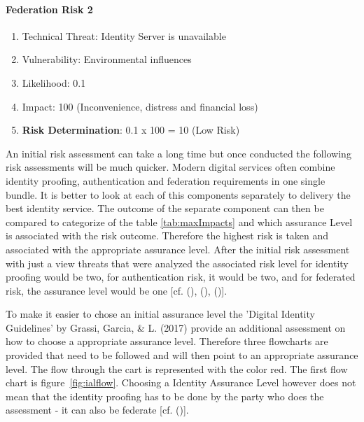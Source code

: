 \paragraph{Federation Risk 2 }
\begin{enumerate}
	\item Technical Threat: Identity Server is unavailable
	\item Vulnerability: Environmental influences 
	\item Likelihood: 0.1
	\item Impact: 100 (Inconvenience, distress and financial loss)
	\item \textbf{Risk Determination}: 0.1 x 100 = 10 (Low Risk)
\end{enumerate}


An initial risk assessment can take a long time but once conducted the following risk assessments will be much quicker. Modern digital services often combine identity proofing, authentication and federation requirements in one single bundle. It is better to look at each of this components separately to delivery the best identity service. The outcome of the separate component can then be compared to categorize of the table \ref{tab:maxImpacts} and which assurance Level is associated with the risk outcome. Therefore the highest risk is taken and associated with the appropriate assurance level. After the initial risk assessment with just a view threats that were analyzed the associated risk level for identity proofing would be two, for authentication risk, it would be two, and for federated risk, the assurance level would be one [cf. (\cite{NIST:2017:DIG}), (\cite{NIST:2018:RMF}), (\cite{Hudson:2015:SecurityRisk})].

To make it easier to chose an initial assurance level the 'Digital Identity Guidelines' by Grassi, Garcia, \& L. (2017) provide an additional assessment on how to choose a appropriate assurance level. Therefore three flowcharts are provided that need to be followed and will then point to an appropriate assurance level. The flow through the cart is represented with the color red. The first flow chart is figure~\ref{fig:ialflow}. Choosing a Identity Assurance Level however does not mean that the identity proofing has to be done by the party who does the assessment - it can also be federate [cf. (\cite{NIST:2017:DIG})]. 

